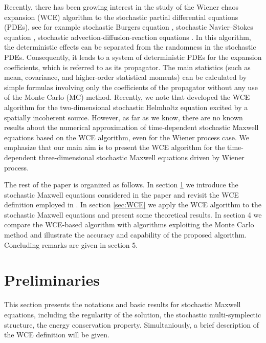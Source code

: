 \documentclass[preprint,12pt]{article}
\numberwithin{figure}{section}
\numberwithin{table}{section}
\numberwithin{equation}{section}
\begin{document}
Recently, there has been growing interest in the study of the Wiener chaos expansion (WCE) algorithm to the stochastic partial differential equations (PDEs), see for example stochastic Burgers equation \cite{RefHLRZ2006}, stochastic Navier--Stokes equation \cite{RefMR2004}, stochastic advection-diffusion-reaction equations \cite{RefZRTK2012}. In this algorithm, the deterministic effects can be separated from the randomness in the stochastic PDEs. Consequently, it leads to a system of deterministic PDEs for the expansion coefficients, which is referred to as its propagator. The main statistics (such as mean, covariance, and higher-order statistical moments) can be calculated by simple formulas involving only the coefficients of the propagator without any use of the Monte Carlo (MC) method. Recently, we note that \cite{RefBAZC2009} developed the WCE algorithm for the two-dimensional stochastic Helmholtz equation excited by a spatially incoherent source. However, as far as we know, there are no known results about the numerical approximation of time-dependent stochastic Maxwell equations based on the WCE algorithm, even for the Wiener process case. We emphasize that our main aim is to present the WCE algorithm for the time-dependent three-dimensional stochastic Maxwell equations driven by Wiener process.

The rest of the paper is organized as follows. In section \ref{Preliminary} we introduce the stochastic Maxwell equations considered in the paper and revisit the WCE definition employed in \cite{RefHLRZ2006}. In section \ref{sec:WCE} we apply the WCE algorithm to the stochastic Maxwell equations and present some theoretical results. In section 4 we compare the WCE-based algorithm with algorithms exploiting the Monte Carlo method and illustrate the accuracy and capability of the proposed algorithm. Concluding remarks are given in section 5.
\section{Preliminaries}
\label{Preliminary}
This section presents the notations and basic results for stochastic Maxwell equations, including the regularity of the solution, the stochastic multi-symplectic structure, the energy conservation property. Simultaniously, a brief description of the WCE definition will be given.
\end{document}
